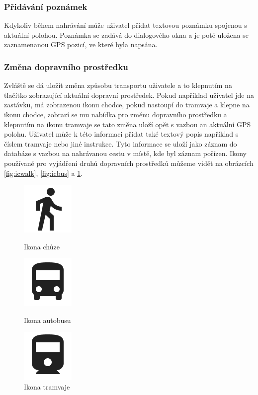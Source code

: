 \documentclass[czech,master,public,dept460,male,java,cpdeclaration]{diploma}
\begin{document}
\subsubsection{Přidávání poznámek}
Kdykoliv během nahrávání může uživatel přidat textovou poznámku spojenou s aktuální polohou.
 Poznámka se zadává do dialogového okna a je poté uložena se zaznamenanou GPS pozicí, ve které byla napsána.

\subsubsection{Změna dopravního prostředku}
Zvláště se dá uložit změna způsobu transportu uživatele a to klepnutím na tlačítko zobrazující
aktuální dopravní prostředek. Pokud například uživatel jde na zastávku, má zobrazenou ikonu chodce,
pokud nastoupí do tramvaje a klepne na ikonu chodce, zobrazí se mu nabídka pro změnu dopravního
prostředku a klepnutím na ikonu tramvaje se tato změna uloží opět s vazbou an aktuální GPS polohu.
Uživatel může k této informaci přidat také textový popis například s číslem tramvaje nebo jiné instrukce.
Tyto informace se uloží jako záznam do databáze s vazbou na nahrávanou cestu v místě, kde byl záznam pořízen.
Ikony používané pro vyjádření druhů dopravních prostředků můžeme vidět na obrázcích \ref{fig:icwalk},
\ref{fig:icbus} a \ref{fig:ictram}.

\begin{figure}[H]
  \centering
  \includegraphics[scale=0.2]{img/ic_directions_walk_black_24dp.png}
  \caption{Ikona chůze}\label{fig:icwalk}
\endminipage\hfill
{}
  \centering
  \includegraphics[scale=0.2]{img/ic_directions_bus_black_24dp.png}
  \caption{Ikona autobusu}\label{fig:icbus}
\endminipage\hfill
{}%
  \centering
  \includegraphics[scale=0.2]{img/ic_directions_railway_black_24dp.png}
  \caption{Ikona tramvaje}\label{fig:ictram}
\endminipage
\end{figure}
\end{document}
